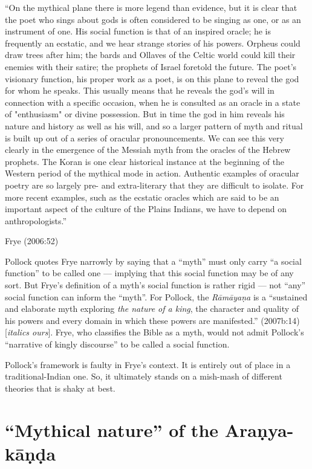 \begin{myquote}
“On the mythical plane there is more legend than evidence, but it is clear that the poet who sings about gods is often considered to be singing as one, or as an instrument of one. His social function is that of an inspired oracle; he is frequently an ecstatic, and we hear strange stories of his powers. Orpheus could draw trees after him; the bards and Ollaves of the Celtic world could kill their enemies with their satire; the prophets of Israel foretold the future. The poet's visionary function, his proper work as a poet, is on this plane to reveal the god for whom he speaks. This usually means that he reveals the god's will in connection with a specific occasion, when he is consulted as an oracle in a state of "enthusiasm" or divine possession. But in time the god in him reveals his nature and history as well as his will, and so a larger pattern of myth and ritual is built up out of a series of oracular pronouncements. We can see this very clearly in the emergence of the Messiah myth from the oracles of the Hebrew prophets. The Koran is one clear historical instance at the beginning of the Western period of the mythical mode in action. Authentic examples of oracular poetry are so largely pre- and extra-literary that they are difficult to isolate. For more recent examples, such as the ecstatic oracles which are said to be an important aspect of the culture of the Plains Indians, we have to depend on anthropologists.”

\hfill Frye (2006:52)
\end{myquote}

Pollock quotes Frye narrowly by saying that a “myth” must only carry  “a social function” to be called one --- implying that this social function may be of any sort. But Frye’s definition of a myth’s social function is rather rigid --- not “any” social function can inform the “myth”. For Pollock, the {\sl Rāmāyaṇa} is a “sustained and elaborate myth exploring {\sl the nature of a king}, the character and quality of his powers and every domain in which these powers are manifested.” (2007b:14) [{\sl italics ours}]. Frye, who classifies the Bible as a myth, would not admit Pollock’s “narrative of kingly discourse” to be called a social function. 

Pollock’s framework is faulty in Frye’s context. It is entirely out of place in a traditional-Indian one.  So, it ultimately stands on a mish-mash of different theories that is shaky at best.  

\section{“Mythical nature” of the Araṇya-kāṇḍa}\label{sec2.3}


